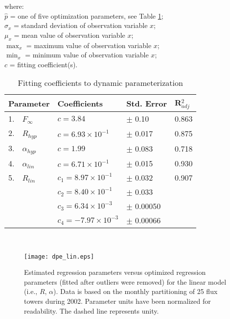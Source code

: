 \noindent where:\\
\indent $\hat{p}$ = one of five optimization parameters, 
                    see Table \ref{tab:dpe};\\
\indent $\sigma_{x}$ = standard deviation of observation variable $x$;\\
\indent $\mu_{x}$ = mean value of observation variable $x$;\\
\indent $\max_{x}$ = maximum value of observation variable $x$;\\
\indent $\min_{x}$ = minimum value of observation variable $x$;\\
\indent $c$ = fitting coefficient(s).\\
\begin{table}[h]
    \caption{Fitting coefficients to dynamic parameterization}
    \label{tab:dpe}
    \centering
    \begin{tabular}{l l l l}
    \hline
    \bf{Parameter} & \bf{Coefficients} & \bf{Std. Error} & \bf{R$_{adj}^{2}$}\\
    \hline
    1.~~$F_{\infty}$ & $c = 3.84$                & $\pm$ 0.10  & 0.863 \\
    2.~~$R_{hyp}$    & $c = 6.93 \times 10^{-1}$ & $\pm$ 0.017 & 0.875 \\
    3.~~$\alpha_{hyp}$ & $c = 1.99$                & $\pm$ 0.083 & 0.718 \\
    4.~~$\alpha_{lin}$ & $c = 6.71 \times 10^{-1}$ & $\pm$ 0.015 & 0.930 \\
    5.~~$R_{lin}$  & $c_{1} = 8.97 \times 10^{-1}$  & $\pm$ 0.032 & 0.907 \\
    ~              & $c_{2} = 8.40 \times 10^{-1}$  & $\pm$ 0.033 & ~ \\
    ~              & $c_{3} = 6.34 \times 10^{-3}$  & $\pm$ 0.00050 & ~ \\
    ~              & $c_{4} = -7.97 \times 10^{-3}$ & $\pm$ 0.00066 & ~ \\
    \hline
    \end{tabular}\\
\end{table}
\begin{figure}[h!]
    \texttt{[image: dpe\_lin.eps]}
    \caption{Estimated regression parameters versus optimized regression 
    parameters (fitted after outliers were removed) for the linear model 
    (i.e., $R$, $\alpha$). Data is based on the monthly partitioning of 25 flux 
    towers during 2002. Parameter units have been normalized for readability. 
    The dashed line represents unity.}
    \label{fig:lmodest}
\end{figure}

